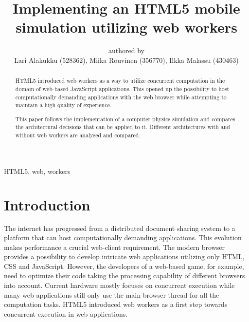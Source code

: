\documentclass[conference, 9pt]{IEEEtran}
\begin{document}
\title{Implementing an HTML5 mobile simulation utilizing web workers}

\author{authored by\\
        Lari Alakukku (528362),
        Miika Rouvinen (356770),
        Ilkka Malassu (430463)}%

\makeatletter         
\def\@maketitle{
\begin{center}
{\Huge \bfseries \sffamily \@title }\\[4ex] 
Submitted on \@date\\
{\normalsize \@author}\\[4ex] 
\end{center}}
\makeatother


\maketitle

\begin{IEEEkeywords}
HTML5, web, workers
\end{IEEEkeywords}

\begin{abstract}

HTML5 introduced web workers as a way to utilize concurrent computation in the domain of web-based JavaScript applications. This opened up the possibility to host 
computationally demanding applications with the web browser while attempting to maintain a high quality of experience.

This paper follows the implementation of a computer physics simulation and compares the architectural decisions that can be applied to it. Different architectures with and 
without web workers are analysed and compared.%
 
\end{abstract}

\section{Introduction}
\label{chap:introduction}

The internet has progressed from a distributed document sharing system to a platform that can host computationally demanding applications. This evolution makes performance a crucial web-client requirement. The modern browser provides a possibility to develop intricate web applications utilizing only HTML, CSS and JavaScript. However, the developers of a web-based game, for example, need to optimize their code taking the processing capability of different browsers into account. Current hardware mostly focuses on concurrent execution while many web applications still only use the main browser thread for all the computation tasks. HTML5 introduced web workers as a first step towards concurrent execution in web applications. \cite{doha}
\end{document}
